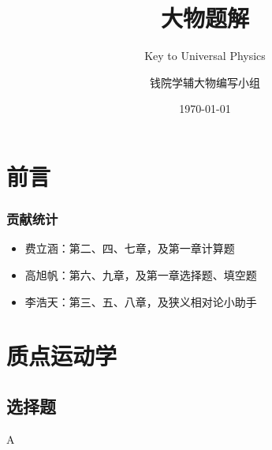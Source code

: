 \documentclass[b5paper,opensource,sourcefont,parskip]{qyxf-book}
\title{大物题解}
\subtitle{Key to Universal Physics}
\author{钱院学辅大物编写小组}
\date{\today}
\begin{document}
\maketitle

\chapter*{前言}
\subsection*{贡献统计}
\begin{itemize}
	\item 费立涵：第二、四、七章，及第一章计算题
	\item 高旭帆：第六、九章，及第一章选择题、填空题
	\item 李浩天：第三、五、八章，及狭义相对论小助手
\end{itemize}

\cleardoublepage

\tableofcontents

\setlength{\parindent}{0pt}
\chapter{质点运动学}
\section{选择题}
A
\end{document}
